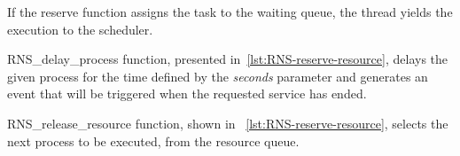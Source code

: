 If the reserve function assigns the task to the waiting queue, the thread yields the execution to the scheduler.



RNS\_delay\_process function, presented in~\ref{lst:RNS-reserve-resource}, delays the given process for the time defined by the \emph{seconds} parameter and generates an event that will be triggered when the requested service has ended.



RNS\_release\_resource function, shown in ~\ref{lst:RNS-reserve-resource}, selects the next process to be executed, from the resource queue. 


